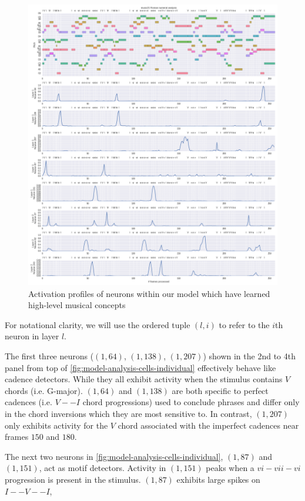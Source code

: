 \documentclass[dissertation.tex]{subfiles}
\begin{document}
\begin{figure}[htpb]
    \centering
    \includegraphics[width=1.0\linewidth]{Figures/model-analysis-cells-individual.png}
    \caption{Activation profiles of neurons within our model which have learned
    high-level musical concepts}
    \label{fig:model-analysis-cells-individual}
\end{figure}

For notational clarity, we will use the ordered tuple $(l,i)$ to refer to the
$i$th neuron in layer $l$.

The first three neurons ($(1,64)$, $(1,138)$, $(1,207)$) shown in the 2nd to
4th panel from top of \autoref{fig:model-analysis-cells-individual} effectively
behave like cadence detectors. While they all exhibit activity when the
stimulus contains $V$ chords (i.e. G-major). $(1,64)$ and $(1,138)$ are both
specific to perfect cadences (i.e. $V -- I$ chord progressions) used to
conclude phrases and differ only in the chord inversions which they are most
sensitive to. In contrast, $(1,207)$ only exhibits activity for the $V$ chord
associated with the imperfect cadences near frames $150$ and $180$.

The next two neurons in \autoref{fig:model-analysis-cells-individual}, $(1,87)$
and $(1,151)$, act as motif detectors. Activity in $(1,151)$ peaks when a $vi-vii-vi$
progression is present in the stimulus. $(1,87)$ exhibits large spikes on $I--V--I$,
\end{document}
